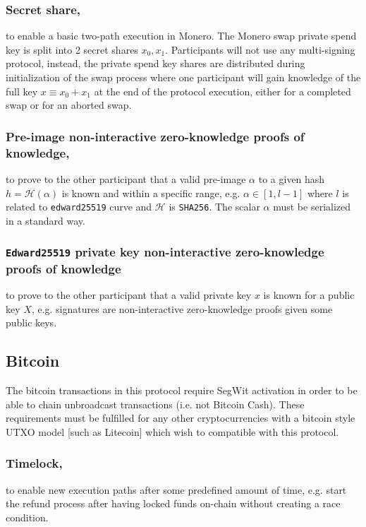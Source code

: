 \documentclass{llncs}
\begin{document}
\subsubsection{Secret share,}
to enable a basic two-path execution in Monero. The Monero swap private spend key is split into 2 secret shares $x_0, x_1$. Participants will not use any multi-signing protocol, instead, the private spend key shares are distributed during initialization of the swap process where one participant will gain knowledge of the full key $x \equiv x_0 + x_1$ at the end of the protocol execution, either for a completed swap or for an aborted swap.

\subsubsection{Pre-image non-interactive zero-knowledge proofs of knowledge,}
to prove to the other participant that a valid pre-image $\alpha$ to a given hash $h = \mathcal{H}(\alpha)$ is known and within a specific range, e.g. $\alpha \in [1, l-1]$ where $l$ is related to \texttt{edward25519} curve and $\mathcal{H}$ is \texttt{SHA256}. The scalar $\alpha$ must be serialized in a standard way.

\subsubsection{\texttt{Edward25519} private key non-interactive zero-knowledge proofs of knowledge}
to prove to the other participant that a valid private key $x$ is known for a public key $X$, e.g. signatures are non-interactive zero-knowledge proofs given some public keys.

\subsection{Bitcoin}
The bitcoin transactions in this protocol require SegWit activation in order to be able to chain unbroadcast transactions (i.e. not Bitcoin Cash). These requirements must be fulfilled for any other cryptocurrencies with a bitcoin style UTXO model [such as Litecoin] which wish to compatible with this protocol.

\subsubsection{Timelock,}
to enable new execution paths after some predefined amount of time, e.g. start the refund process after having locked funds on-chain without creating a race condition.
\end{document}
